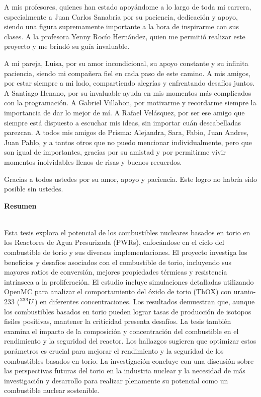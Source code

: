 A mis profesores, quienes han estado apoyándome a lo largo de toda mi carrera, especialmente a Juan Carlos Sanabria por su paciencia, dedicación y apoyo, siendo una figura supremamente importante a la hora de inspirarme con sus clases. A la profesora Yenny Rocío Hernández, quien me permitió realizar este proyecto y me brindó su guía invaluable.

A mi pareja, Luisa, por su amor incondicional, su apoyo constante y su infinita paciencia, siendo mi compañera fiel en cada paso de este camino. A mis amigos, por estar siempre a mi lado, compartiendo alegrías y enfrentando desafíos juntos. A Santiago Henano, por su invaluable ayuda en mis momentos más complicados con la programación. A Gabriel Villabon, por motivarme y recordarme siempre la importancia de dar lo mejor de mí. A Rafael Velásquez, por ser ese amigo que siempre está dispuesto a escuchar mis ideas, sin importar cuán descabelladas parezcan. A todos mis amigos de Prisma: Alejandra, Sara, Fabio, Juan Andres, Juan Pablo, y a tantos otros que no puedo mencionar individualmente, pero que son igual de importantes, gracias por su amistad y por permitirme vivir momentos inolvidables llenos de risas y buenos recuerdos.

Gracias a todos ustedes por su amor, apoyo y paciencia. Este logro no habría sido posible sin ustedes.
\newpage

\textbf{\LARGE Resumen}
\\
Esta tesis explora el potencial de los combustibles nucleares basados en torio en los Reactores de Agua Presurizada (PWRs), enfocándose en el ciclo del combustible de torio y sus diversas implementaciones. El proyecto investiga los beneficios y desafíos asociados con el combustible de torio, incluyendo sus mayores ratios de conversión, mejores propiedades térmicas y resistencia intrínseca a la proliferación. El estudio incluye simulaciones detalladas utilizando OpenMC para analizar el comportamiento del óxido de torio (ThOX) con uranio-233 (\(\prescript{233}{}{U}\)) en diferentes concentraciones. Los resultados demuestran que, aunque los combustibles basados en torio pueden lograr tasas de producción de isotopos fisiles positivas, mantener la criticidad presenta desafíos. La tesis también examina el impacto de la composición y concentración del combustible en el rendimiento y la seguridad del reactor. Los hallazgos sugieren que optimizar estos parámetros es crucial para mejorar el rendimiento y la seguridad de los combustibles basados en torio. La investigación concluye con una discusión sobre las perspectivas futuras del torio en la industria nuclear y la necesidad de más investigación y desarrollo para realizar plenamente su potencial como un combustible nuclear sostenible.

